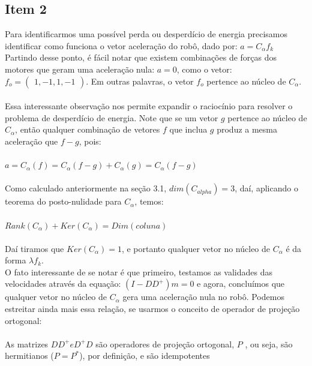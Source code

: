 \documentclass{article}
\begin{document}
\subsection{Item 2}
\hspace{1cm}Para identificarmos uma possível perda ou desperdício de energia precisamos identificar como funciona o vetor aceleração do robô, dado por: 
$ a = C_{\alpha}f_{k}$ Partindo desse ponto, é fácil notar que existem combinações de forças dos motores que geram uma aceleração nula:
$ a = 0 $, como o vetor: $f_{o} = \begin{pmatrix} 1,-1,1,-1\end{pmatrix}$. Em outras palavras, o vetor $f_{o}$ pertence ao núcleo de $C_{\alpha}$.
\\ \\
\hspace{1cm}Essa interessante observação nos permite expandir o raciocínio para resolver o problema de desperdício de energia. Note que se um vetor $g$ pertence ao núcleo de $C_{\alpha}$, então qualquer combinação de vetores $f$ que inclua $g$
produz a mesma aceleração que $f - g$, pois:\\
\\  $ a = C_{\alpha}(f) = C_{\alpha}(f-g) + C_{\alpha}(g) = C_{\alpha}(f-g)$
\\ \\
\hspace{1cm}Como calculado anteriormente na seção 3.1, $dim(C_{alpha}) = 3$, daí, aplicando o teorema do posto-nulidade para $C_{\alpha}$, temos:
\\  \\ $ Rank(C_{\alpha}) + Ker(C_{\alpha}) = Dim(coluna)$ \\ \\
\hspace{1cm}Daí tiramos que $Ker(C_{\alpha}) = 1 $, e portanto qualquer vetor no núcleo de $C_{\alpha}$ é da forma $\lambda f_{k}$.
\\ \hspace{1cm}O fato interessante de se notar é que primeiro, testamos as validades das velocidades através da equação: $(I-DD^+)m = 0$
e agora, concluímos que qualquer vetor no núcleo de $C_{\alpha}$ gera uma aceleração nula no robô. Podemos estreitar ainda mais essa relação,
se usarmos o conceito de operador de projeção ortogonal:
\\ \\ \hspace{1cm}As matrizes $DD^+ e D^+D$ são operadores de projeção ortogonal, $P$ , ou seja, são hermitianos ($P = P^*$), por definição, e são idempotentes
\end{document}
